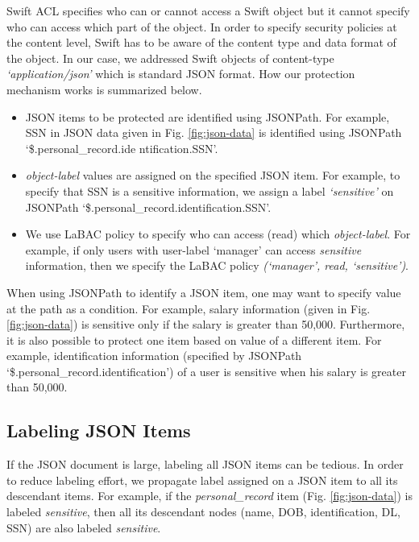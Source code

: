 Swift ACL specifies who can or cannot access a Swift object but it cannot   specify who can access which part of the object.  In order to specify security policies at the content level, Swift has to be aware of the content type and data format of the object. In our case, we addressed Swift objects of content-type \emph{`application/json'} which is  standard JSON format. How our protection mechanism works  is summarized below.

\begin{itemize}
\item JSON items to be protected are identified using JSONPath. For example, SSN in JSON data given in Fig. \ref{fig:json-data} is identified using JSONPath `\$.personal\_record.ide ntification.SSN'.
\item  \emph{object-label} values are assigned on the specified JSON item. For example, to specify that SSN is a sensitive information, we assign a label \emph{`sensitive'} on JSONPath `\$.personal\_record.identification.SSN'.

\item We use LaBAC policy to specify who can access (read) which \emph{object-label}. For example, if only users with user-label `manager' can access \emph{sensitive} information, then we specify the LaBAC policy \emph{(`manager', read, `sensitive')}.

\end{itemize}

When using JSONPath to identify a JSON item, one may want to  specify value at the path  as a condition. For example, salary information (given in Fig. \ref{fig:json-data}) is sensitive only if the salary is greater than 50,000. Furthermore, it is also possible to protect one item based on value of a different item. For example, identification information (specified by JSONPath   `\$.personal\_record.identification') of a user is sensitive when his salary is greater than 50,000.

\subsection{Labeling  JSON Items}
If the JSON document is large, labeling all JSON items can be tedious. In order to reduce labeling effort, we propagate label assigned on a JSON item to all its descendant items. For example, if the \emph{personal\_record}  item (Fig. \ref{fig:json-data}) is labeled \emph{sensitive}, then all its descendant nodes (name, DOB, identification, DL, SSN) are also labeled  \emph{sensitive}.




